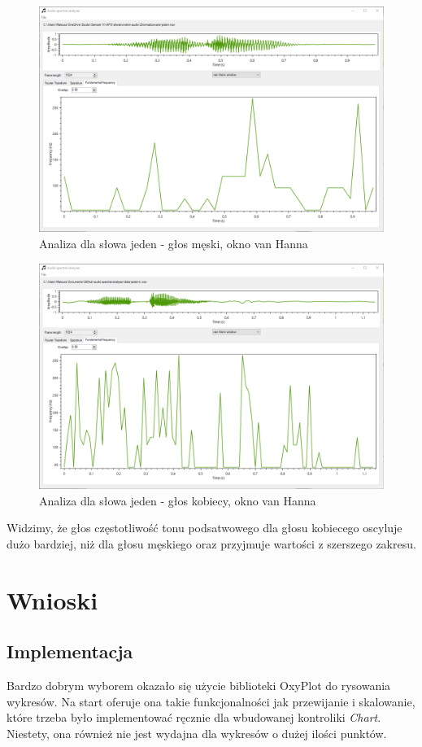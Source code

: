 \documentclass{article}
\begin{document}
\begin{figure}[H]
\includegraphics[width=6in]{scr16.png}
\centering
\caption{Analiza dla słowa jeden - głos męski, okno van Hanna}
\end{figure}

\begin{figure}[H]
\includegraphics[width=6in]{scr17.png}
\centering
\caption{Analiza dla słowa jeden - głos kobiecy, okno van Hanna}
\end{figure}

Widzimy, że głos częstotliwość tonu podsatwowego dla głosu kobiecego oscyluje dużo bardziej, niż dla głosu męskiego oraz przyjmuje wartości z szerszego zakresu.

\section{Wnioski}
\subsection{Implementacja}
Bardzo dobrym wyborem okazało się użycie biblioteki OxyPlot do rysowania wykresów. Na start oferuje ona takie funkcjonalności jak przewijanie i skalowanie, które trzeba było implementować ręcznie dla wbudowanej kontroliki \textit{Chart}. Niestety, ona również nie jest wydajna dla wykresów o dużej ilości punktów.
\end{document}
